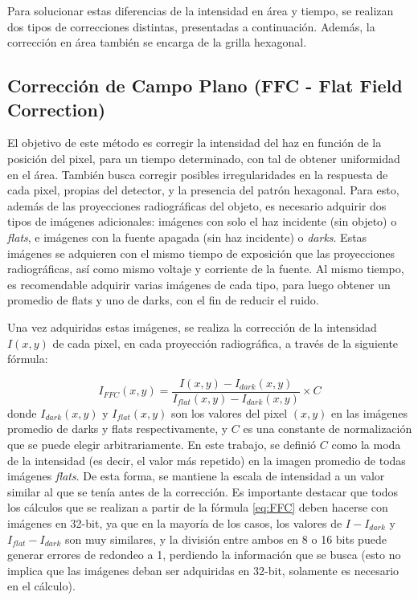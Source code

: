 Para solucionar estas diferencias de la intensidad en área y tiempo, se realizan dos tipos de correcciones
distintas, presentadas a continuación. Además, la corrección en área también se encarga de la grilla hexagonal.

\subsection{Corrección de Campo Plano (FFC - Flat Field Correction)}

El objetivo de este método es corregir la intensidad del haz en función de la posición del pixel,
para un tiempo determinado, con tal de obtener uniformidad en el área. También busca corregir
posibles irregularidades en la respuesta de cada pixel, propias del detector, y la presencia del
patrón hexagonal. Para esto, además de las proyecciones radiográficas del objeto, es necesario
adquirir dos tipos de imágenes adicionales: imágenes con solo el haz incidente (sin objeto) o
\textit{flats}, e imágenes con la fuente apagada (sin haz incidente) o \textit{darks}.
Estas imágenes se adquieren con el mismo tiempo de exposición que las proyecciones radiográficas,
así como mismo voltaje y corriente de la fuente. Al mismo tiempo, es recomendable adquirir varias
imágenes de cada tipo, para luego obtener un promedio de flats y uno de darks, con el fin de reducir
el ruido.

Una vez adquiridas estas imágenes, se realiza la corrección de la intensidad $I(x,y)$ de cada pixel,
en cada proyección radiográfica, a través de la siguiente fórmula:

\begin{equation}
    I_{FFC}(x,y) = \dfrac{I(x,y) - I_{dark}(x,y)}{I_{flat}(x,y) - I_{dark}(x,y)} \times C
    \label{eq:FFC}
\end{equation}
donde $I_{dark}(x,y)$ y $I_{flat}(x,y)$ son los valores del pixel $(x,y)$ en las imágenes promedio
de darks y flats respectivamente, y $C$ es una constante de normalización que se puede elegir
arbitrariamente. En este trabajo, se definió $C$ como la moda de la intensidad (es decir, el valor
más repetido) en la imagen promedio de todas imágenes \textit{flats}. De esta forma,
se mantiene la escala de intensidad a un valor similar al que se tenía antes de la corrección.
Es importante destacar que todos los cálculos que se realizan a partir de la fórmula \ref{eq:FFC}
deben hacerse con imágenes en 32-bit, ya que en la mayoría de los casos, los valores de $I - I_{dark}$
y $I_{flat} - I_{dark}$ son muy similares, y la división entre ambos en 8 o 16 bits puede generar
errores de redondeo a 1, perdiendo la información que se busca (esto no implica que las imágenes deban
ser adquiridas en 32-bit, solamente es necesario en el cálculo).

